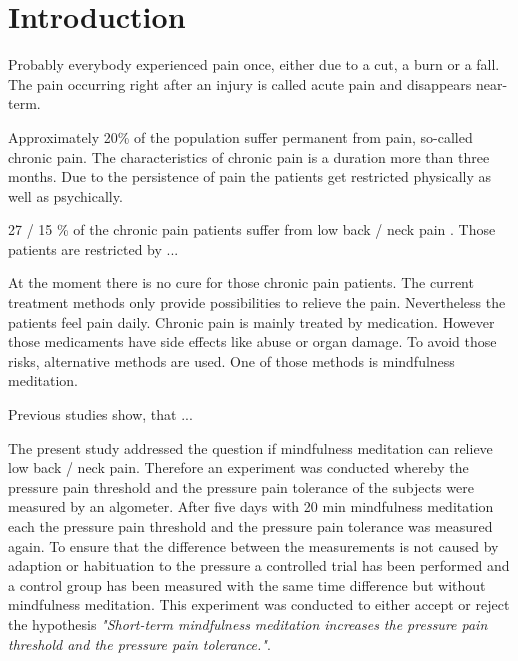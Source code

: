 \chapter{Introduction}

Probably everybody experienced pain once, either due to a cut, a burn or a fall. The pain occurring right after an injury is called acute pain and disappears near-term.

Approximately 20\% of the population suffer permanent from pain, so-called chronic pain. The characteristics of chronic pain is a duration more than three months. Due to the persistence of pain the patients get restricted physically as well as psychically. %

27 / 15 \% of the chronic pain patients suffer from low back / neck pain . Those patients are restricted by ...

At the moment there is no cure for those chronic pain patients. The current treatment methods only provide possibilities to relieve the pain. Nevertheless the patients feel pain daily.
Chronic pain is mainly treated by medication. However those medicaments have side effects like abuse or organ damage. To avoid those risks, alternative methods are used. One of those methods is mindfulness meditation. %

Previous studies show, that ...

The present study addressed the question if mindfulness meditation can relieve low back / neck pain. Therefore an experiment was conducted whereby the pressure pain threshold and the pressure pain tolerance of the subjects were measured by an algometer. After five days with 20 min mindfulness meditation each the pressure pain threshold and the pressure pain tolerance was measured again. To ensure that the difference between the measurements is not caused by adaption or habituation to the pressure a controlled trial has been performed and a control group has been measured with the same time difference but without mindfulness meditation.
This experiment was conducted to either accept or reject the hypothesis \textit{"Short-term mindfulness meditation increases the pressure pain threshold and the pressure pain tolerance."}.